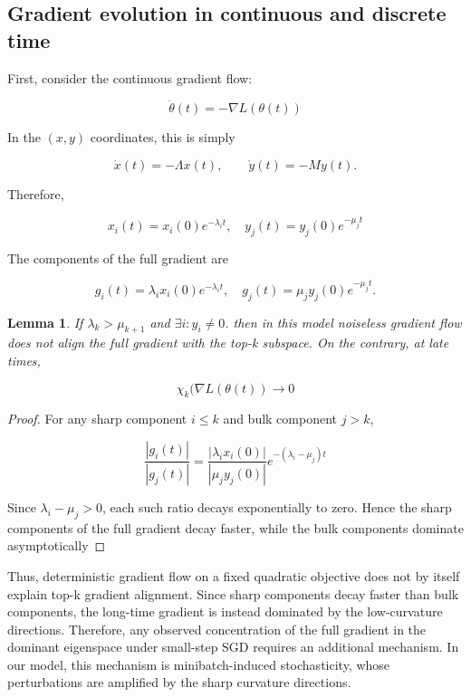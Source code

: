 \documentclass[conference]{IEEEtran}
\newtheorem{lemma}{Lemma}
\begin{document}
\subsection{Gradient evolution in continuous and discrete time}

First, consider the continuous gradient flow:

\[
\dot\theta(t) = -\nabla L(\theta(t))
\]

In the $(x,y)$ coordinates, this is simply

\[
\dot{x}(t)=-\Lambda x(t),\qquad\dot{y}(t)=-M y(t).
\]

Therefore,

\[
x_i(t)=x_i(0)e^{-\lambda_i t},\quad y_j(t)=y_j(0)e^{-\mu_j t}
\]

The components of the full gradient are

\[g_i(t)=\lambda_i x_i(0)e^{-\lambda_i t}, \quad g_j(t)=\mu_j y_j(0)e^{-\mu_j t}.
\]

\begin{lemma}

    If $\lambda_k > \mu_{k+1}$ and $\exists i: y_i \ne 0$. then in this model noiseless gradient flow does not align the full gradient with the top-k subspace. On the contrary, at late times,
    
    \[
    \chi_k(\nabla L(\theta(t)) \to 0
    \]
    
\end{lemma}

\begin{proof}
    For any sharp component $i \le k$ and bulk component $j > k$,
    
    \[
    \frac{|g_i(t)|}{|g_j(t)|} = \frac{|\lambda_ix_i(0)|}{|\mu_jy_j(0)|}e^{-(\lambda_i-\mu_j)t}
    \]

    Since $\lambda_i - \mu_j > 0$, each such ratio decays exponentially to zero. Hence the sharp components of the full gradient decay faster, while the bulk components dominate asymptotically
    
\end{proof}

Thus, deterministic gradient flow on a fixed quadratic objective does not by itself explain top-k gradient alignment. Since sharp components decay faster than bulk components, the long-time gradient is instead dominated by the low-curvature directions. Therefore, any observed concentration of the full gradient in the dominant eigenspace under small-step SGD requires an additional mechanism. In our model, this mechanism is minibatch-induced stochasticity, whose perturbations are amplified by the sharp curvature directions.
\end{document}
